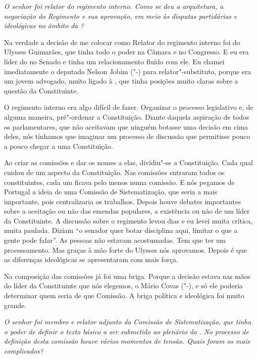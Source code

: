 \medskip

\noindent\emph{O senhor foi relator do regimento interno. Como se deu a
arquitetura, a negociação do Regimento e sua aprovação, em meio às
disputas partidárias e ideológicas no âmbito da ?}

Na verdade a decisão de me colocar como Relator do
regimento interno foi do Ulysses Guimarães, que tinha todo o poder na
Câmara e no Congresso. E eu era líder do  no Senado e tinha um
relacionamento fluído com ele. Eu chamei imediatamente o deputado Nelson
Jobim ("-) para relator"-substituto, porque era um jovem advogado,
muito ligado à , que tinha posições muito claras sobre a questão da
Constituinte.

O regimento interno era algo difícil de fazer. Organizar o processo
legislativo e, de alguma maneira, pré"-ordenar a Constituição. Diante
daquela aspiração de todos os parlamentares, que não aceitavam que
ninguém botasse uma decisão em cima deles, nós tínhamos que imaginar um
processo de discussão que permitisse pouco a pouco chegar a uma
Constituição.

Ao criar as comissões e dar os nomes a elas, dividiu"-se a Constituição.
Cada qual cuidou de um aspecto da Constituição. Nas comissões entraram
todos os constituintes, cada um ficava pelo menos numa comissão. E nós
pegamos de Portugal a ideia de uma Comissão de Sistematização, que seria
a mais importante, pois centralizaria os trabalhos. Depois houve debates
importantes sobre a aceitação ou não das emendas populares, a existência
ou não de um líder da Constituinte. A discussão sobre o regimento levou
dias e eu levei muita crítica, muita paulada. Diziam ``o senador quer
botar disciplina aqui, limitar o que a gente pode falar''. As pessoas
não estavam acostumadas. Tem que ter um processamento. Mas graças à mão
forte do Ulysses nós aprovamos. Depois é que as diferenças ideológicas
se apresentaram com mais força.

Na composição das comissões já foi uma briga. Porque a decisão estava
nas mãos do líder da Constituinte que nós elegemos, o Mário Covas
("-), e só ele poderia determinar quem seria de que Comissão. A
briga política e ideológica foi muito grande.

\medskip

\noindent\emph{O senhor foi membro e relator adjunto da Comissão de
Sistematização, que tinha o poder de definir o texto básico a ser
submetido ao plenário da . No processo de definição desta comissão
houve vários momentos de tensão. Quais foram os mais complicados?}


